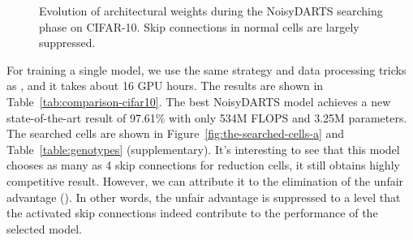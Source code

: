 \documentclass{article}
\newcommand{\citec}[1]{(\cite{#1})}
\begin{document}
\begin{figure}[ht]
       \centering
       \caption{Evolution of architectural weights during the NoisyDARTS searching phase on CIFAR-10. Skip connections in normal cells are largely suppressed.}
       \label{fig:alpha-evolution-best}
\end{figure}

For training a single model, we use the same strategy and data processing tricks as \cite{chen2019progressive,liu2018darts}, and it takes about 16 GPU hours. 
The results are shown in Table~\ref{tab:comparison-cifar10}. The best NoisyDARTS model achieves a new state-of-the-art result of 97.61\% with only 534M FLOPS and 3.25M parameters. The searched cells are shown in Figure~\ref{fig:the-searched-cells-a} and Table~\ref{table:genotypes} (supplementary). It's interesting to see that this model chooses as many as 4 skip connections for reduction cells, it still obtains highly competitive result. However, we can attribute it to the elimination of the unfair advantage \citec{chu2019fair}. In other words, the unfair advantage is suppressed to a level that the activated skip connections indeed contribute to the performance of the selected model.
\end{document}
